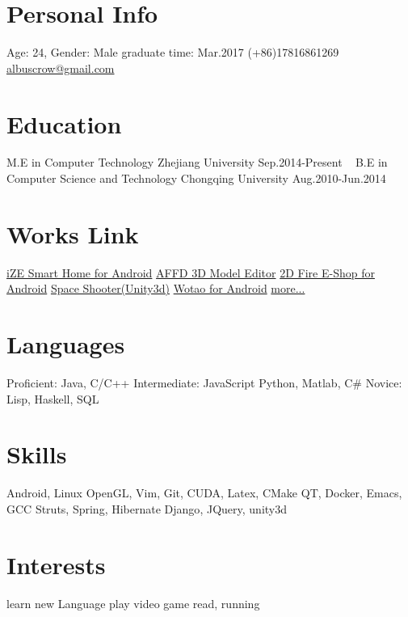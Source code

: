 \documentclass[print]{friggeri-cv} %
\begin{document}


\begin{aside} %
\section{Personal Info}
Age: 24, Gender: Male
graduate time: Mar.2017
(+86)17816861269
\href{mailto:albuscrow@gmail.com}{albuscrow@gmail.com}
\section{Education}
M.E in Computer Technology
Zhejiang University
Sep.2014-Present
~
B.E in Computer Science and Technology
Chongqing University
Aug.2010-Jun.2014
\section{Works Link}
\href{http://www.hisensehitachi.com/jstx/index.aspx?nodeid=1162}{iZE Smart Home for Android}
\href{https://github.com/albuscrow/AFFD}{AFFD 3D Model Editor}
\href{http://www.jinxizi.cn/android/huozhanggui.html}{2D Fire E-Shop for Android}
\href{https://github.com/albuscrow/learn_unity}{Space Shooter(Unity3d)}
\href{http://36kr.com/p/5043478.html}{Wotao for Android}
\href{https://github.com/albuscrow}{more...}
\section{Languages}
Proficient: Java, C/C++
Intermediate: JavaScript
Python, Matlab, C\#
Novice: Lisp, Haskell, SQL
\section{Skills}
\LARGE{Android}\normalsize{, }\LARGE{Linux}
\large{OpenGL}\normalsize{, }\large{Vim}\normalsize{, }\large{Git}\normalsize{, }
\normalsize{CUDA, Latex, CMake}
\normalsize{QT, Docker, Emacs, GCC}
\small{Struts}\normalsize{, }\small{Spring}\normalsize{, }\small{Hibernate}
\small{Django}\normalsize{, }\small{JQuery}\normalsize{, }\small{unity3d}
\section{Interests}
\normalsize{learn new Language
play video game
read, running}
\end{aside}
\end{document}
